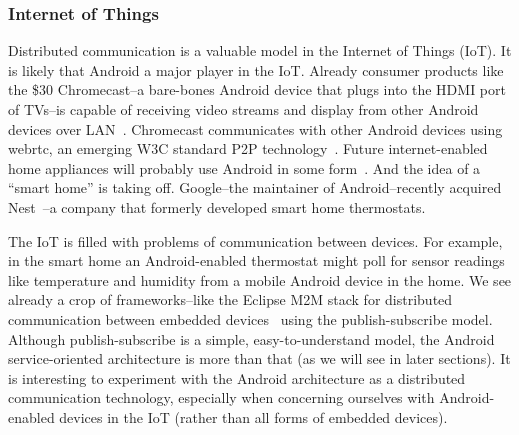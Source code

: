 \documentclass[prodmode]{acmlarge}
\begin{document}
\subsubsection{Internet of Things}
Distributed communication is a valuable model in the Internet of Things (IoT). It is likely that Android a major player in the IoT. Already consumer products like the \$30 Chromecast--a bare-bones Android device that plugs into the HDMI port of TVs--is capable of receiving video streams and display from other Android devices over LAN~\cite{chromecast}. Chromecast communicates with other Android devices using webrtc, an emerging W3C standard P2P technology~\cite{ChromecastWebrtc}. Future internet-enabled home appliances will probably use Android in some form~\cite{AndroidEverywhere}. And the idea of a ``smart home'' is taking off. Google--the maintainer of Android--recently acquired Nest~\cite{GoogleNest}--a company that formerly developed smart home thermostats.

The IoT is filled with problems of communication between devices. For example, in the smart home an Android-enabled thermostat might poll for sensor readings like temperature and humidity from a mobile Android device in the home. We see already a crop of frameworks--like the Eclipse M2M stack for distributed communication between embedded devices~\cite{eclipse_m2m} using the publish-subscribe model. Although publish-subscribe is a simple, easy-to-understand model, the Android service-oriented architecture is more than that (as we will see in later sections). It is interesting to experiment with the Android architecture as a distributed communication technology, especially when concerning ourselves with Android-enabled devices in the IoT (rather than all forms of embedded devices).
\end{document}
